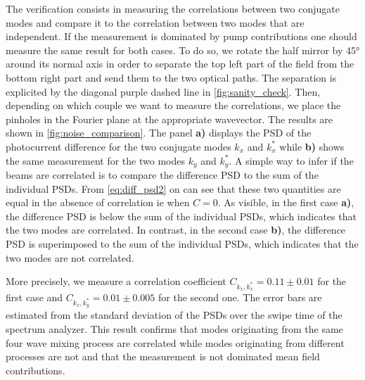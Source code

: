 The verification consists in measuring the correlations between two conjugate modes and compare it to the correlation between two modes that are independent.
If the measurement is dominated by pump contributions one should measure the same result for both cases. To do so, we rotate the half mirror by 45° around its normal axis in order to separate the top left part of the field from the bottom right part and send them to the two optical paths. The separation is explicited
by the diagonal purple dashed line in \autoref{fig:sanity_check}. Then, depending on which couple we want to measure the correlations, we place the pinholes in the Fourier plane at the appropriate wavevector.
The results are shown in \autoref{fig:noise_comparison}. The panel \textbf{a)} displays the PSD of the photocurrent difference for the two conjugate modes $k_x$ and $k_x^*$ while \textbf{b)} shows the same measurement for the two modes $k_y$ and $k_y^*$. 
A simple way to infer if the beams are correlated is to compare the difference PSD to the sum of the individual PSDs. From \autoref{eq:diff_psd2} on can see that these two quantities are equal in the absence of correlation ie when $C=0$. As visible, in the first case \textbf{a)}, the difference PSD is below the sum of the individual PSDs, which indicates that the two modes are correlated. In contrast, in the second case \textbf{b)}, the difference PSD is superimposed to the sum of the individual PSDs, which indicates that the two modes are not correlated. 

More precisely, we measure a correlation coefficient $C_{k_x,k_x^*}=0.11\pm{0.01}$ for the first case and $C_{k_x,k_y^*}=0.01\pm{0.005}$ for the second one. The error bars are estimated from the standard deviation of the PSDs over the swipe time of the spectrum analyzer.
This result confirms that modes originating from the same four wave mixing process are correlated while modes originating from different processes are not and that the measurement is 
not dominated mean field contributions.


